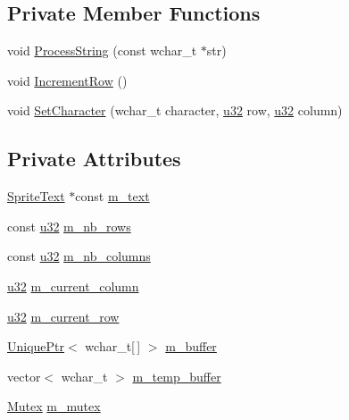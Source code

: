 \subsection*{Private Member Functions}
\begin{DoxyCompactItemize}
\item 
void \hyperlink{classmage_1_1_text_console_script_ac1e1d4768ead2de82493ab487449bbd8}{Process\+String} (const wchar\+\_\+t $\ast$str)
\item 
void \hyperlink{classmage_1_1_text_console_script_a0e82c5d5b84499bf4ed2233cf26145fa}{Increment\+Row} ()
\item 
void \hyperlink{classmage_1_1_text_console_script_a5a968a3966cf030685ca9c04df4b8c04}{Set\+Character} (wchar\+\_\+t character, \hyperlink{namespacemage_af2b398bf98eb10351f49cad73fe2cc73}{u32} row, \hyperlink{namespacemage_af2b398bf98eb10351f49cad73fe2cc73}{u32} column)
\end{DoxyCompactItemize}
\subsection*{Private Attributes}
\begin{DoxyCompactItemize}
\item 
\hyperlink{classmage_1_1_sprite_text}{Sprite\+Text} $\ast$const \hyperlink{classmage_1_1_text_console_script_a43ef712ae52d2776edba574d32f759bc}{m\+\_\+text}
\item 
const \hyperlink{namespacemage_af2b398bf98eb10351f49cad73fe2cc73}{u32} \hyperlink{classmage_1_1_text_console_script_ae88a050607f3bc7b3f1c0a10c79a3b9d}{m\+\_\+nb\+\_\+rows}
\item 
const \hyperlink{namespacemage_af2b398bf98eb10351f49cad73fe2cc73}{u32} \hyperlink{classmage_1_1_text_console_script_a9dc2fbd08ed85b4b79ab2426e0bfa411}{m\+\_\+nb\+\_\+columns}
\item 
\hyperlink{namespacemage_af2b398bf98eb10351f49cad73fe2cc73}{u32} \hyperlink{classmage_1_1_text_console_script_a051d5079f65d12603aaac8a526c4fb81}{m\+\_\+current\+\_\+column}
\item 
\hyperlink{namespacemage_af2b398bf98eb10351f49cad73fe2cc73}{u32} \hyperlink{classmage_1_1_text_console_script_a2459fb0c54aecdbd86fa0c628641bf45}{m\+\_\+current\+\_\+row}
\item 
\hyperlink{namespacemage_a3316d7143a973e37adf1110f2e80ca31}{Unique\+Ptr}$<$ wchar\+\_\+t\mbox{[}$\,$\mbox{]} $>$ \hyperlink{classmage_1_1_text_console_script_a526410b1b43646948809b772c5446346}{m\+\_\+buffer}
\item 
vector$<$ wchar\+\_\+t $>$ \hyperlink{classmage_1_1_text_console_script_a6500bfd006f5c90d05f3da7f3e8e75a8}{m\+\_\+temp\+\_\+buffer}
\item 
\hyperlink{structmage_1_1_mutex}{Mutex} \hyperlink{classmage_1_1_text_console_script_a7212b01c007fc3d2fd11620c570f1c55}{m\+\_\+mutex}
\end{DoxyCompactItemize}
